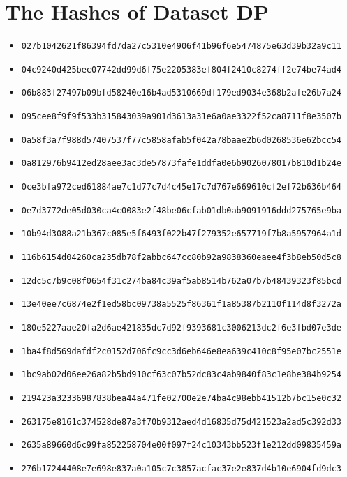 \section{The Hashes of Dataset DP}\label{appendix:hashes dataset dp}
{\footnotesize
\begin{itemize}
    \item \texttt{027b1042621f86394fd7da27c5310e4906f41b96f6e5474875e63d39b32a9c11}
    \item \texttt{04c9240d425bec07742dd99d6f75e2205383ef804f2410c8274ff2e74be74ad4}
    \item \texttt{06b883f27497b09bfd58240e16b4ad5310669df179ed9034e368b2afe26b7a24}
    \item \texttt{095cee8f9f9f533b315843039a901d3613a31e6a0ae3322f52ca8711f8e3507b}
    \item \texttt{0a58f3a7f988d57407537f77c5858afab5f042a78baae2b6d0268536e62bcc54}
    \item \texttt{0a812976b9412ed28aee3ac3de57873fafe1ddfa0e6b9026078017b810d1b24e}
    \item \texttt{0ce3bfa972ced61884ae7c1d77c7d4c45e17c7d767e669610cf2ef72b636b464}
    \item \texttt{0e7d3772de05d030ca4c0083e2f48be06cfab01db0ab9091916ddd275765e9ba}
    \item \texttt{10b94d3088a21b367c085e5f6493f022b47f279352e657719f7b8a5957964a1d}
    \item \texttt{116b6154d04260ca235db78f2abbc647cc80b92a9838360eaee4f3b8eb50d5c8}
    \item \texttt{12dc5c7b9c08f0654f31c274ba84c39af5ab8514b762a07b7b48439323f85bcd}
    \item \texttt{13e40ee7c6874e2f1ed58bc09738a5525f86361f1a85387b2110f114d8f3272a}
    \item \texttt{180e5227aae20fa2d6ae421835dc7d92f9393681c3006213dc2f6e3fbd07e3de}
    \item \texttt{1ba4f8d569dafdf2c0152d706fc9cc3d6eb646e8ea639c410c8f95e07bc2551e}
    \item \texttt{1bc9ab02d06ee26a82b5bd910cf63c07b52dc83c4ab9840f83c1e8be384b9254}
    \item \texttt{219423a32336987838bea44a471fe02700e2e74ba4c98ebb41512b7bc15e0c32}
    \item \texttt{263175e8161c374528de87a3f70b9312aed4d16835d75d421523a2ad5c392d33}
    \item \texttt{2635a89660d6c99fa852258704e00f097f24c10343bb523f1e212dd09835459a}
    \item \texttt{276b17244408e7e698e837a0a105c7c3857acfac37e2e837d4b10e6904fd9dc3}

\end{itemize}}
